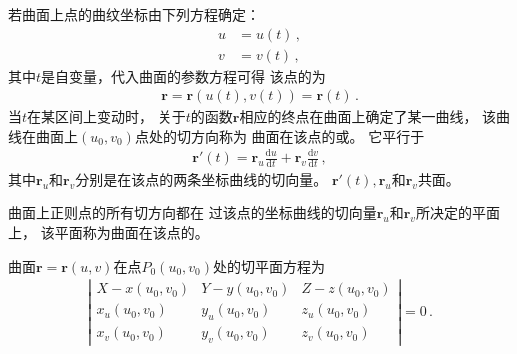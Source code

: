 若曲面上点的曲纹坐标由下列方程确定：
\begin{align}\label{eq:03ex01.13}
    u & =u(t)\, , \\
    v & =v(t)\, ,
\end{align}
其中$t$是自变量，代入曲面的参数方程可得
该点的为
\begin{align}\label{eq:03ex01.14}
    \bm r=\bm r\left(u(t),v(t)\right)=\bm r(t)\, .
\end{align}
当$t$在某区间上变动时，
关于$t$的函数$\bm r$相应的终点在曲面上确定了某一曲线，
该曲线在曲面上$(u_0,v_0)$点处的切方向称为
曲面在该点的或。
它平行于
\begin{align}\label{eq:03ex01.15}
    \bm r'(t)=\bm r_u\frac{\mathrm{d}u}{\mathrm{d}t}+\bm r_v\frac{\mathrm{d}v}{\mathrm{d}t}\, ,
\end{align}
其中$\bm r_u$和$\bm r_v$分别是在该点的两条坐标曲线的切向量。
$\bm r'(t),\bm r_u$和$\bm r_v$共面。
\begin{definition}
    曲面上正则点的所有切方向都在
    过该点的坐标曲线的切向量$\bm r_u$和$\bm r_v$所决定的平面上，
    该平面称为曲面在该点的。
\end{definition}
\begin{corollary}
    曲面$\bm r=\bm r(u,v)$在点$P_0(u_0,v_0)$处的切平面方程为
    \begin{align}\label{eq:03ex01.16}
        \left|
        \begin{array}{ccc}
            X-x(u_0,v_0) & Y-y(u_0,v_0) & Z-z(u_0,v_0) \\
            x_u(u_0,v_0) & y_u(u_0,v_0) & z_u(u_0,v_0) \\
            x_v(u_0,v_0) & y_v(u_0,v_0) & z_v(u_0,v_0)
        \end{array}\right|=0\, .
    \end{align}
\end{corollary}

